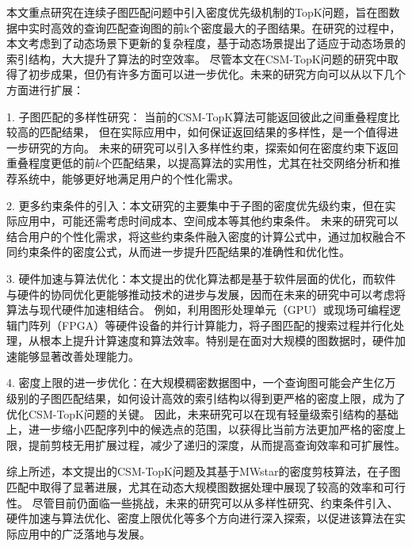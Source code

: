 \begin{summary}
	本文重点研究在连续子图匹配问题中引入密度优先级机制的TopK问题，旨在图数据中实时高效的查询匹配查询图的前k个密度最大的子图结果。在研究的过程中，本文考虑到了动态场景下更新的复杂程度，基于动态场景提出了适应于动态场景的索引结构，大大提升了算法的时空效率。
	尽管本文在CSM-TopK问题的研究中取得了初步成果，但仍有许多方面可以进一步优化。未来的研究方向可以从以下几个方面进行扩展：

		1.	子图匹配的多样性研究：
		当前的CSM-TopK算法可能返回彼此之间重叠程度比较高的匹配结果，
		但在实际应用中，如何保证返回结果的多样性，是一个值得进一步研究的方向。
		未来的研究可以引入多样性约束，探索如何在密度约束下返回重叠程度更低的前$k$个匹配结果，以提高算法的实用性，尤其在社交网络分析和推荐系统中，能够更好地满足用户的个性化需求。

		2.	更多约束条件的引入：本文研究的主要集中于子图的密度优先级约束，但在实际应用中，可能还需考虑时间成本、空间成本等其他约束条件。
		未来的研究可以结合用户的个性化需求，将这些约束条件融入密度的计算公式中，通过加权融合不同约束条件的密度公式，从而进一步提升匹配结果的准确性和优化性。

		3.	硬件加速与算法优化：本文提出的优化算法都是基于软件层面的优化，而软件与硬件的协同优化更能够推动技术的进步与发展，因而在未来的研究中可以考虑将算法与现代硬件加速相结合。
		例如，利用图形处理单元（GPU）或现场可编程逻辑门阵列（FPGA）等硬件设备的并行计算能力，将子图匹配的搜索过程并行化处理，从根本上提升计算速度和算法效率。特别是在面对大规模的图数据时，硬件加速能够显著改善处理能力。

		4.	密度上限的进一步优化：在大规模稠密数据图中，一个查询图可能会产生亿万级别的子图匹配结果，如何设计高效的索引结构以得到更严格的密度上限，成为了优化CSM-TopK问题的关键。
		因此，未来研究可以在现有轻量级索引结构的基础上，进一步缩小匹配序列中的候选点的范围，以获得比当前方法更加严格的密度上限，提前剪枝无用扩展过程，减少了递归的深度，从而提高查询效率和可扩展性。

	综上所述，本文提出的CSM-TopK问题及其基于MWstar的密度剪枝算法，在子图匹配中取得了显著进展，尤其在动态大规模图数据处理中展现了较高的效率和可行性。
	尽管目前仍面临一些挑战，未来的研究可以从多样性研究、约束条件引入、硬件加速与算法优化、密度上限优化等多个方向进行深入探索，以促进该算法在实际应用中的广泛落地与发展。
\end{summary}
